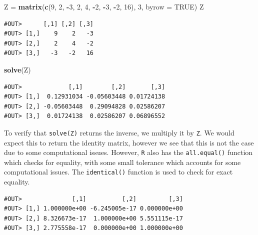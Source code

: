 \documentclass[]{book}
\newenvironment{Shaded}{\begin{snugshade}}{\end{snugshade}}
\newcommand{\KeywordTok}[1]{\textcolor[rgb]{0.13,0.29,0.53}{\textbf{#1}}}
\newcommand{\DataTypeTok}[1]{\textcolor[rgb]{0.13,0.29,0.53}{#1}}
\newcommand{\DecValTok}[1]{\textcolor[rgb]{0.00,0.00,0.81}{#1}}
\newcommand{\StringTok}[1]{\textcolor[rgb]{0.31,0.60,0.02}{#1}}
\newcommand{\OtherTok}[1]{\textcolor[rgb]{0.56,0.35,0.01}{#1}}
\newcommand{\OperatorTok}[1]{\textcolor[rgb]{0.81,0.36,0.00}{\textbf{#1}}}
\newcommand{\NormalTok}[1]{#1}
\theoremstyle{definition}
\theoremstyle{definition}
\theoremstyle{definition}
\theoremstyle{remark}
\begin{document}
\begin{Shaded}
\begin{Highlighting}[]
\NormalTok{Z =}\StringTok{ }\KeywordTok{matrix}\NormalTok{(}\KeywordTok{c}\NormalTok{(}\DecValTok{9}\NormalTok{, }\DecValTok{2}\NormalTok{, }\OperatorTok{-}\DecValTok{3}\NormalTok{, }\DecValTok{2}\NormalTok{, }\DecValTok{4}\NormalTok{, }\OperatorTok{-}\DecValTok{2}\NormalTok{, }\OperatorTok{-}\DecValTok{3}\NormalTok{, }\OperatorTok{-}\DecValTok{2}\NormalTok{, }\DecValTok{16}\NormalTok{), }\DecValTok{3}\NormalTok{, }\DataTypeTok{byrow =} \OtherTok{TRUE}\NormalTok{)}
\NormalTok{Z}
\end{Highlighting}
\end{Shaded}

\begin{verbatim}
#OUT>      [,1] [,2] [,3]
#OUT> [1,]    9    2   -3
#OUT> [2,]    2    4   -2
#OUT> [3,]   -3   -2   16
\end{verbatim}

\begin{Shaded}
\begin{Highlighting}[]
\KeywordTok{solve}\NormalTok{(Z)}
\end{Highlighting}
\end{Shaded}

\begin{verbatim}
#OUT>             [,1]        [,2]       [,3]
#OUT> [1,]  0.12931034 -0.05603448 0.01724138
#OUT> [2,] -0.05603448  0.29094828 0.02586207
#OUT> [3,]  0.01724138  0.02586207 0.06896552
\end{verbatim}

To verify that \texttt{solve(Z)} returns the inverse, we multiply it by
\texttt{Z}. We would expect this to return the identity matrix, however
we see that this is not the case due to some computational issues.
However, \texttt{R} also has the \texttt{all.equal()} function which
checks for equality, with some small tolerance which accounts for some
computational issues. The \texttt{identical()} function is used to check
for exact equality.

\begin{Shaded}
\end{Shaded}

\begin{verbatim}
#OUT>              [,1]          [,2]         [,3]
#OUT> [1,] 1.000000e+00 -6.245005e-17 0.000000e+00
#OUT> [2,] 8.326673e-17  1.000000e+00 5.551115e-17
#OUT> [3,] 2.775558e-17  0.000000e+00 1.000000e+00
\end{verbatim}
\end{document}
